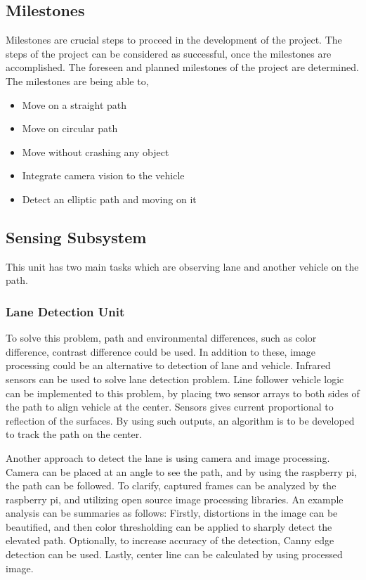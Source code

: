 \documentclass[a4paper,12pt]{article}
\begin{document}
\subsection{Milestones}
	Milestones are crucial steps to proceed in the development of the project. The steps of the project can be considered as successful, once the milestones are accomplished. The foreseen and planned milestones of the project are determined. The milestones are being able to,
	\begin{itemize}
		\item Move on a straight path  \vspace{-.2cm}
		\item Move on circular path \vspace{-.2cm}
		\item Move without crashing any object \vspace{-.2cm}
		\item Integrate camera vision to the vehicle  \vspace{-.2cm}
		\item Detect an elliptic path and moving on it \vspace{-.2cm}	
	\end{itemize}

	 
	
\subsection{Sensing Subsystem}
This unit has two main tasks which are observing lane and another vehicle on the path. 
\subsubsection{Lane Detection Unit}
To solve this problem, path and environmental differences, such as color difference, contrast difference could be used. In addition to these, image processing could be an alternative to detection of lane and vehicle. 
Infrared sensors can be used to solve lane detection problem. Line follower vehicle logic can be implemented to this problem, by placing two sensor arrays to both sides of the path to align vehicle at the center. Sensors gives current proportional to reflection of the surfaces. By using such outputs, an algorithm is to be developed to track the path on the center. 

Another approach to detect the lane is using camera and image processing. Camera can be placed at an angle to see the path, and by using the raspberry pi, the path can be followed. To clarify, captured frames can be analyzed by the raspberry pi, and utilizing open source image processing libraries. An example analysis can be summaries as follows: Firstly, distortions in the image can be beautified, and then color thresholding can be applied to sharply detect the elevated path. Optionally, to increase accuracy of the detection, Canny edge detection can be used. Lastly, center line can be calculated by using processed image. 
\end{document}
